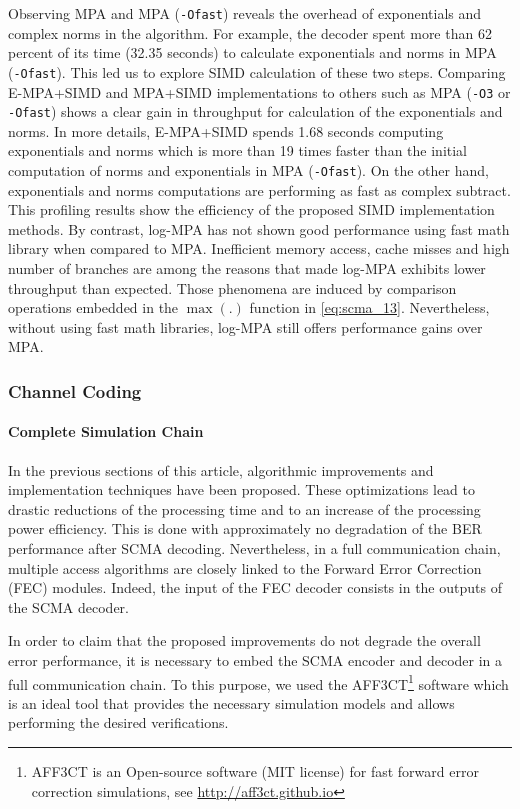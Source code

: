 Observing MPA and MPA (\verb|-Ofast|) reveals the overhead of exponentials and
complex norms in the algorithm. For example, the decoder spent more than 62
percent of its time (32.35 seconds) to calculate exponentials and norms in MPA
(\verb|-Ofast|). This led us to explore SIMD calculation of these two steps.
Comparing E-MPA+SIMD and MPA+SIMD implementations to others such as MPA
(\verb|-O3| or \verb|-Ofast|) shows a clear gain in throughput for calculation
of the exponentials and norms. In more details, E-MPA+SIMD spends 1.68 seconds
computing exponentials and norms which is more than 19 times faster than the
initial computation of norms and exponentials in MPA (\verb|-Ofast|). On the
other hand, exponentials and norms computations are performing as fast as
complex subtract. This profiling results show the efficiency of the proposed
SIMD implementation methods. By contrast, log-MPA has not shown good performance
using fast math library when compared to MPA. Inefficient memory access, cache
misses and high number of branches are among the reasons that made log-MPA
exhibits lower throughput than expected. Those phenomena are induced by
comparison operations embedded in the $\max(.)$ function in \eqref{eq:scma_13}.
Nevertheless, without using fast math libraries, log-MPA
still offers performance gains over MPA.

\subsubsection{Channel Coding}
\label{sec:scma_fec}

\paragraph{Complete Simulation Chain}
\label{sec:scma_fec_chain}

In the previous sections of this article, algorithmic improvements and
implementation techniques have been proposed. These optimizations lead to
drastic reductions of the processing time and to an increase of the processing
power efficiency. This is done with approximately no degradation of the BER
performance after SCMA decoding. Nevertheless, in a full communication chain,
multiple access algorithms are closely linked to the Forward Error Correction
(FEC) modules. Indeed, the input of the FEC decoder consists in the outputs of
the SCMA decoder.

In order to claim that the proposed improvements do not degrade the overall
error performance, it is necessary to embed the SCMA encoder and decoder in a
full communication chain. To this purpose, we used the AFF3CT\footnote{AFF3CT is
an Open-source software (MIT license) for fast forward error correction
simulations, see \url{http://aff3ct.github.io}} software which is an ideal
tool that provides the necessary simulation models and allows performing the
desired verifications.

